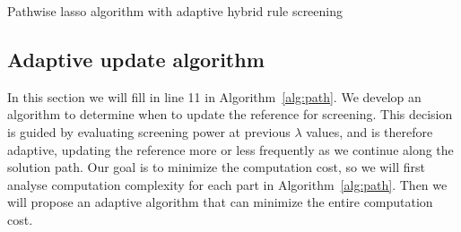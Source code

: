 \begin{algorithm}[H]
  \label{alg:path}
    \SetAlgoLined
    \BlankLine
    
    \caption{Pathwise lasso algorithm with adaptive hybrid rule screening}
\end{algorithm}

\subsection{Adaptive update algorithm}
\label{sec:adaptive}

In this section we will fill in line 11 in Algorithm~\ref{alg:path}. We develop an algorithm to determine when to update the reference for screening. This decision is guided by evaluating screening power at previous $\lambda$ values, and is therefore adaptive, updating the reference more or less frequently as we continue along the solution path. Our goal is to minimize the computation cost, so we will first analyse computation complexity for each part in Algorithm~\ref{alg:path}. Then we will propose an adaptive algorithm that can minimize the entire computation cost.

